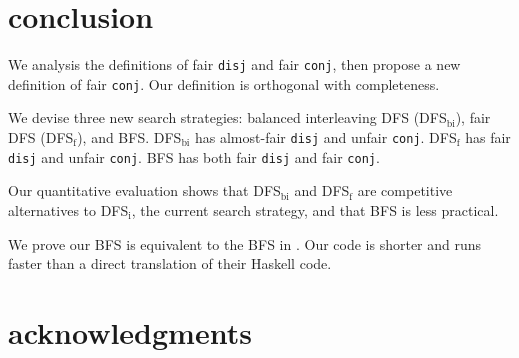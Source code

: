 \documentclass[format=acmlarge, review=true, authordraft=true]{acmart}
\newcommand{\conj}{\texttt{conj}}
\newcommand{\disj}{\texttt{disj}}
\begin{document}
\section{conclusion}

We analysis the definitions of fair \disj{} and fair \conj{}, then propose a 
new definition of fair \conj{}. Our definition is orthogonal with completeness.

We devise three new search strategies: balanced interleaving DFS (DFS$_\textrm{bi}$), fair 
DFS (DFS$_\textrm{f}$), and BFS. DFS$_\textrm{bi}$ has almost-fair \disj{} and unfair \conj{}. DFS$_\textrm{f}$ has 
fair \disj{} and unfair \conj{}. BFS has both fair \disj{} and fair \conj{}.

Our quantitative evaluation shows that DFS$_\textrm{bi}$ and DFS$_\textrm{f}$ are competitive 
alternatives to DFS$_\textrm{i}$, the current search strategy, and that BFS is less 
practical.

We prove our BFS is equivalent to the BFS in \citet{seres1999algebra}. Our code 
is shorter and runs faster than a direct translation of their Haskell code.

\section*{acknowledgments}



\end{document}
